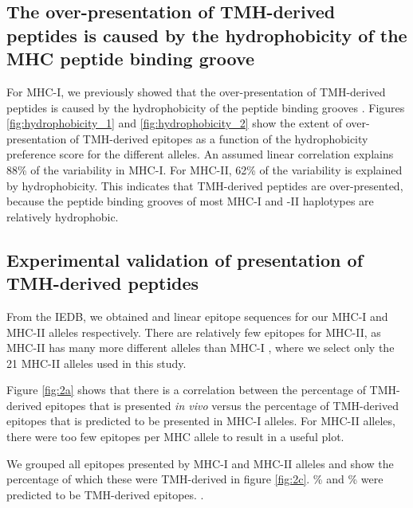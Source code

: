 \subsection{The over-presentation of TMH-derived peptides is caused by the hydrophobicity of the MHC peptide binding groove}

For MHC-I, we previously showed that the over-presentation of TMH-derived 
peptides is caused by the hydrophobicity of the peptide binding 
grooves \cite{bianchi2017}. 
Figures \ref{fig:hydrophobicity_1} and \ref{fig:hydrophobicity_2}
show the extent of over-presentation
of TMH-derived epitopes as a function of the hydrophobicity preference score 
for the different alleles.
An assumed linear correlation explains 88\% of the variability in MHC-I.
For MHC-II, 62\% of the variability is explained by hydrophobicity. 
This indicates that TMH-derived peptides are over-presented, 
because the peptide binding grooves of most MHC-I and -II haplotypes 
are relatively hydrophobic.

\subsection{Experimental validation of presentation of TMH-derived peptides}

From the IEDB,
we obtained 
and  linear epitope sequences for our MHC-I 
and MHC-II alleles respectively.
There are relatively few epitopes for MHC-II, 
as MHC-II has many more different alleles than MHC-I , 
where we select only the 21 MHC-II alleles used in this study.

Figure \ref{fig:2a} shows that there is a correlation between the
percentage of TMH-derived epitopes that is presented \emph{in vivo}
versus the percentage of TMH-derived epitopes that is predicted to be presented
in MHC-I alleles. For MHC-II alleles, there were too few epitopes per MHC allele
to result in a useful plot. 

We grouped all epitopes presented by MHC-I and MHC-II alleles and show 
the percentage of which these were TMH-derived in figure \ref{fig:2c}.
\% and \% were
predicted to be TMH-derived epitopes.
.

